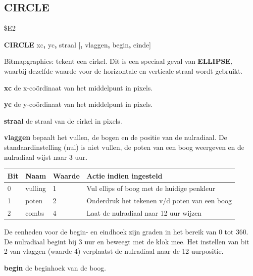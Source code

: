 \subsection{CIRCLE}
\begin{description}[leftmargin=2cm,style=nextline]
\item [Token:]   \$E2

\item [Formaat:]  {\bf CIRCLE} xc{\bf,} yc{\bf,} straal [{\bf,} vlaggen{\bf,} begin{\bf,} einde]

\item [Gebruik:]   Bitmapgraphics: tekent een cirkel. Dit is een speciaal geval van {\bf ELLIPSE}, waarbij dezelfde waarde voor de horizontale en verticale straal wordt gebruikt.

                 {\bf xc} de x-coördinaat van het middelpunt in pixels.

                 {\bf yc} de y-coördinaat van het middelpunt in pixels.

                 {\bf straal} de straal van de cirkel in pixels.

                 {\bf vlaggen} bepaalt het vullen, de bogen en de positie van de nulradiaal. De standaardinstelling (nul) is niet vullen, de poten van een boog weergeven en de nulradiaal wijst naar 3 uur.

                 {\small\setlength{\tabcolsep}{1.5mm}
                 \begin{tabular}{|l|l|l|l|}
                 \hline
                 {\bf Bit}  & {\bf Naam} & {\bf Waarde} & {\bf Actie indien ingesteld} \\
                 \hline
                 0 & vulling  & 1  & Vul ellips of boog met de huidige penkleur \\               1 & poten  & 2  & Onderdruk het tekenen v/d poten van een boog \\                 2 & combs & 4  & Laat de nulradiaal naar 12 uur wijzen \\
                 \hline
                 \end{tabular}
                 }

                 De eenheden voor de begin- en eindhoek zijn graden in het bereik van 0 tot 360. De nulradiaal begint bij 3 uur en beweegt met de klok mee. Het instellen van bit 2 van vlaggen (waarde 4) verplaatst de nulradiaal naar de 12-uurpositie.

                 {\bf begin} de beginhoek van de boog.


\end{description}
